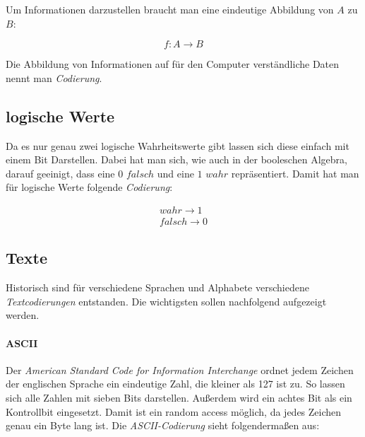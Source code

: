 \documentclass[../main.tex]{subfiles}
\begin{document}
        Um Informationen darzustellen braucht man eine eindeutige Abbildung von $A$ zu $B$:
        
        \begin{equation}
            f\colon A \rightarrow B
        \end{equation}
        
        Die Abbildung von Informationen auf für den Computer verständliche Daten nennt man \emph{Codierung}.
        
        \subsection{logische Werte}
            Da es nur genau zwei logische Wahrheitswerte gibt lassen sich diese einfach mit einem Bit Darstellen. Dabei hat man sich, wie auch in der booleschen Algebra, darauf geeinigt, dass eine $0$ $falsch$ und eine $1$ $wahr$ repräsentiert. Damit hat man für logische Werte folgende \emph{Codierung}:
            
            \begin{subequations}
                \begin{align}
                    wahr \rightarrow 1 \\
                    falsch \rightarrow 0
                \end{align}
            \end{subequations}
            
        \subsection{Texte}
            Historisch sind für verschiedene Sprachen und Alphabete verschiedene \emph{Textcodierungen} entstanden. Die wichtigsten sollen nachfolgend aufgezeigt werden.
            
            \paragraph{ASCII}
                Der \emph{American Standard Code for Information Interchange} ordnet jedem Zeichen der englischen Sprache ein eindeutige Zahl, die kleiner als 127 ist zu. So lassen sich alle Zahlen mit sieben Bits darstellen. Außerdem wird ein achtes Bit als ein Kontrollbit eingesetzt. Damit ist ein random access möglich, da jedes Zeichen genau ein Byte lang ist. Die \emph{ASCII-Codierung} sieht folgendermaßen aus:
                
\end{document}
